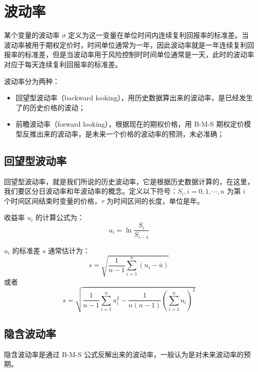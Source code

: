 \documentclass{article}
\begin{document}
\section{波动率}
某个变量的波动率 $\sigma$ 定义为这一变量在单位时间内连续复利回报率的标准差。当波动率被用于期权定价时，时间单位通常为一年，因此波动率就是一年连续复利回报率的标准差，但是当波动率用于风险控制时时间单位通常是一天，此时的波动率对应于每天连续复利回报率的标准差。

波动率分为两种：
\begin{itemize}
    \item 回望型波动率（backward looking），用历史数据算出来的波动率，是已经发生了的历史价格的波动；
    \item 前瞻波动率（forward looking），根据现在的期权价格，用 B-M-S 期权定价模型反推出来的波动率，是未来一个价格的波动率的预测，未必准确；
\end{itemize}
\subsection{回望型波动率}
回望型波动率，就是我们所说的历史波动率，它是根据历史数据计算的，在这里，我们要区分日波动率和年波动率的概念。定义以下符号：$S_i, i=0,1,\cdots,n$ 为第 $i$ 个时间区间结束时变量的价格，$\tau$ 为时间区间的长度，单位是年。

收益率 $u_i$ 的计算公式为：
\begin{equation}
    u_i=\ln\frac{S_i}{S_{i-1}}
\end{equation}

$u_i$ 的标准差 $s$ 通常估计为：
$$s=\sqrt{\frac{1}{n-1}\sum_{i=1}^{n}(u_i-\bar{u})}$$
或者
$$s=\sqrt{\frac{1}{n-1}\sum_{i=1}^{n}u_i^2-\frac{1}{n(n-1)}(\sum_{i=1}^{n}u_i)^2}$$

\subsection{隐含波动率}
隐含波动率是通过 B-M-S 公式反解出来的波动率，一般认为是对未来波动率的预期。
\end{document}
